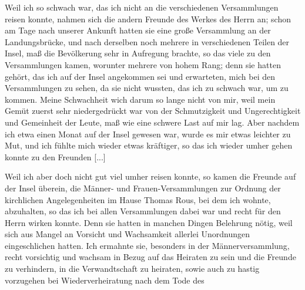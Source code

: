 Weil ich so schwach war, das ich nicht an die verschiedenen
Versammlungen reisen konnte, nahmen sich die andern Freunde
des Werkes des Herrn an; schon am Tage nach unserer Ankunft
hatten sie eine große Versammlung an der Landungsbrücke, und
nach derselben noch mehrere in verschiedenen Teilen der Insel,
maß die Bevölkerung sehr in Aufregung brachte, so das viele zu
den Versammlungen kamen, worunter mehrere von hohem Rang;
denn sie hatten gehört, das ich auf der Insel angekommen sei
und erwarteten, mich bei den Versammlungen zu sehen, da sie
nicht wussten, das ich zu schwach war, um zu kommen. Meine
Schwachheit wich darum so lange nicht von mir, weil mein 
Gemüt zuerst sehr niedergedrückt 
war von der Schmutzigkeit und
Ungerechtigkeit und Gemeinheit der Leute, maß wie eine schwere
Last auf mir lag. Aber nachdem ich etwa einen Monat auf der
Insel gewesen war, wurde es mir etwas leichter zu Mut, und
ich fühlte mich wieder etwas kräftiger, so das ich wieder umher
gehen konnte zu den Freunden [...]

Weil ich aber doch nicht gut viel umher reisen konnte, so
kamen die Freunde auf der Insel überein, die Männer- und
Frauen-Versammlungen zur Ordnung der kirchlichen Angelegenheiten 
im Hause Thomas Rous, bei dem ich wohnte, abzuhalten,
so das ich bei allen Versammlungen dabei war und recht für den
Herrn wirken konnte. Denn sie hatten in manchen Dingen Belehrung
nötig, weil sich aus Mangel an Vorsicht und Wachsamkeit 
allerlei Unordnungen eingeschlichen hatten. Ich ermahnte sie,
besonders in der Männerversammlung, recht vorsichtig und 
wachsam in Bezug auf das Heiraten zu sein und die Freunde zu
verhindern, in die Verwandtschaft zu heiraten, sowie auch zu
hastig vorzugehen bei Wiederverheiratung nach dem Tode des